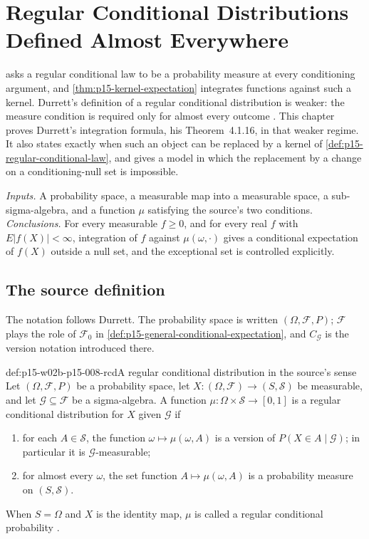 \chapter{Regular Conditional Distributions Defined Almost Everywhere}
\label{sec:p15-w02b-p15-008-ae-kernels}

 asks a regular conditional law to
be a probability measure at every conditioning argument, and
\cref{thm:p15-kernel-expectation} integrates functions against such a
kernel. Durrett's definition of a regular conditional distribution is
weaker: the measure condition is required only for almost every outcome
\cite[p.~214]{DurrettPTEAuthor2019}. This chapter proves Durrett's
integration formula, his Theorem~4.1.16, in that weaker regime. It also
states exactly when such an object can be replaced by a kernel of
\cref{def:p15-regular-conditional-law}, and gives a model in which the
replacement by a change on a conditioning-null set is impossible.

\emph{Inputs.} A probability space, a measurable map into a measurable
space, a sub-sigma-algebra, and a function \(\mu\) satisfying the source's
two conditions. \emph{Conclusions.} For every measurable \(f\geq0\), and for
every real \(f\) with \(E|f(X)|<\infty\), integration of \(f\) against
\(\mu(\omega,\cdot)\) gives a conditional expectation of \(f(X)\) outside a
null set, and the exceptional set is controlled explicitly.

\section{The source definition}
\label{sec:p15-w02b-p15-008-source-definition}

The notation follows Durrett. The probability space is written
\((\Omega,\mathcal F,P)\); \(\mathcal F\) plays the role of
\(\mathcal F_0\) in \cref{def:p15-general-conditional-expectation}, and
\(C_{\mathcal G}\) is the version notation introduced there.

\begin{hbdefinition}{def:p15-w02b-p15-008-rcd}{A regular conditional distribution in the source's sense}
Let \((\Omega,\mathcal F,P)\) be a probability space, let
\(X:(\Omega,\mathcal F)\to(S,\mathcal S)\) be measurable, and let
\(\mathcal G\subseteq\mathcal F\) be a sigma-algebra.
A function \(\mu:\Omega\times\mathcal S\to[0,1]\) is a regular conditional
distribution for \(X\) given \(\mathcal G\) if
\begin{enumerate}
\item for each \(A\in\mathcal S\), the function
      \(\omega\mapsto\mu(\omega,A)\) is a version of
      \(P(X\in A\mid\mathcal G)\); in particular it is
      \(\mathcal G\)-measurable;
\item for almost every \(\omega\), the set function
      \(A\mapsto\mu(\omega,A)\) is a probability measure on
      \((S,\mathcal S)\).
\end{enumerate}
When \(S=\Omega\) and \(X\) is the identity map, \(\mu\) is called a
regular conditional probability \cite[p.~214]{DurrettPTEAuthor2019}.
\end{hbdefinition}

